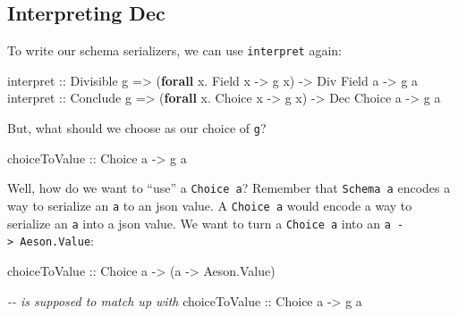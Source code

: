 \documentclass[]{article}
\newenvironment{Shaded}{}{}
\newcommand{\CommentTok}[1]{\textcolor[rgb]{0.38,0.63,0.69}{\textit{#1}}}
\newcommand{\DataTypeTok}[1]{\textcolor[rgb]{0.56,0.13,0.00}{#1}}
\newcommand{\KeywordTok}[1]{\textcolor[rgb]{0.00,0.44,0.13}{\textbf{#1}}}
\newcommand{\NormalTok}[1]{#1}
\newcommand{\OperatorTok}[1]{\textcolor[rgb]{0.40,0.40,0.40}{#1}}
\newcommand{\OtherTok}[1]{\textcolor[rgb]{0.00,0.44,0.13}{#1}}
\begin{document}
\hypertarget{interpreting-dec}{%
\subsection{Interpreting Dec}\label{interpreting-dec}}

To write our schema serializers, we can use \texttt{interpret} again:

\begin{Shaded}
\begin{Highlighting}[]
\OtherTok{interpret ::} \DataTypeTok{Divisible}\NormalTok{ g }\OtherTok{=>}\NormalTok{ (}\KeywordTok{forall}\NormalTok{ x}\OperatorTok{.} \DataTypeTok{Field}\NormalTok{  x }\OtherTok{{-}>}\NormalTok{ g x) }\OtherTok{{-}>} \DataTypeTok{Div} \DataTypeTok{Field}\NormalTok{  a }\OtherTok{{-}>}\NormalTok{ g a}
\OtherTok{interpret ::} \DataTypeTok{Conclude}\NormalTok{ g  }\OtherTok{=>}\NormalTok{ (}\KeywordTok{forall}\NormalTok{ x}\OperatorTok{.} \DataTypeTok{Choice}\NormalTok{ x }\OtherTok{{-}>}\NormalTok{ g x) }\OtherTok{{-}>} \DataTypeTok{Dec} \DataTypeTok{Choice}\NormalTok{ a }\OtherTok{{-}>}\NormalTok{ g a}
\end{Highlighting}
\end{Shaded}

But, what should we choose as our choice of \texttt{g}?

\begin{Shaded}
\begin{Highlighting}[]
\OtherTok{choiceToValue ::} \DataTypeTok{Choice}\NormalTok{ a }\OtherTok{{-}>}\NormalTok{ g a}
\end{Highlighting}
\end{Shaded}

Well, how do we want to ``use'' a \texttt{Choice\ a}? Remember that
\texttt{Schema\ a} encodes a way to serialize an \texttt{a} to an json value. A
\texttt{Choice\ a} would encode a way to serialize an \texttt{a} into a json
value. We want to turn a \texttt{Choice\ a} into an
\texttt{a\ -\textgreater{}\ Aeson.Value}:

\begin{Shaded}
\begin{Highlighting}[]
\OtherTok{choiceToValue ::} \DataTypeTok{Choice}\NormalTok{ a }\OtherTok{{-}>}\NormalTok{ (a }\OtherTok{{-}>} \DataTypeTok{Aeson.Value}\NormalTok{)}

\CommentTok{{-}{-} is supposed to match up with}
\OtherTok{choiceToValue ::} \DataTypeTok{Choice}\NormalTok{ a }\OtherTok{{-}>}\NormalTok{ g a}
\end{Highlighting}
\end{Shaded}
\end{document}
